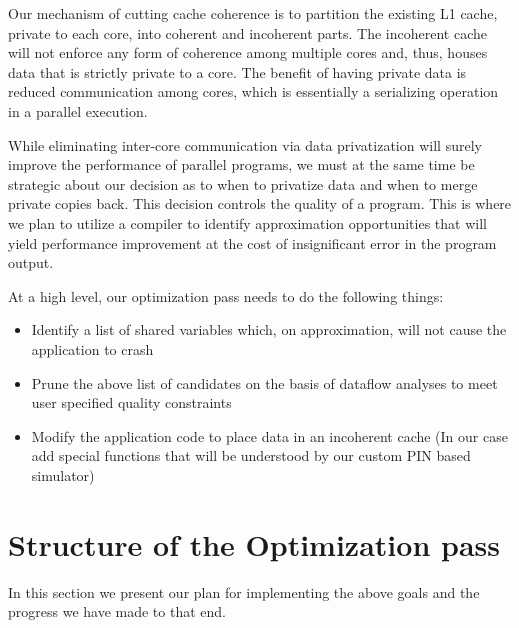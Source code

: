 \documentclass[12pt,conference]{IEEEtran}
\begin{document}
Our mechanism of cutting cache coherence is to partition the
existing L1 cache, private to each core, into coherent and 
incoherent parts. The incoherent cache will not
enforce any form of coherence among multiple cores and, thus,
houses data that is strictly private to a core. The benefit of having private
data is reduced communication among cores, which is essentially a 
serializing operation in a parallel execution. 

While eliminating inter-core communication via data privatization
will surely improve the performance of parallel programs, we must at the same time
be strategic about our decision as to when to privatize data and when to merge private copies
back. This 
decision controls the quality of a program. This is where we plan to 
utilize a compiler to identify approximation opportunities that will 
yield performance improvement at the cost of insignificant error in the
program output.


At a high level, our optimization pass needs to do the following things:
\begin{itemize}
\item Identify a list of shared variables which, on approximation, will not
cause the application to crash
\item Prune the above list of candidates on the basis of dataflow analyses to 
meet user specified quality constraints
\item Modify the application code to place data in an incoherent cache (In our case
add special functions that will be understood by our custom PIN based simulator)
\end{itemize}

\section{Structure of the Optimization pass}

In this section we present our plan for implementing the above goals and
the progress we have made to that end.
\end{document}
